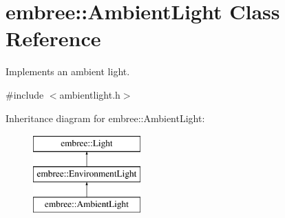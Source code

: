 \hypertarget{classembree_1_1_ambient_light}{
\section{embree::AmbientLight Class Reference}
\label{classembree_1_1_ambient_light}
}


Implements an ambient light.  




{\ttfamily \#include $<$ambientlight.h$>$}

Inheritance diagram for embree::AmbientLight:\begin{figure}[H]
\begin{center}
\leavevmode
\includegraphics[height=3.000000cm]{classembree_1_1_ambient_light}
\end{center}
\end{figure}
